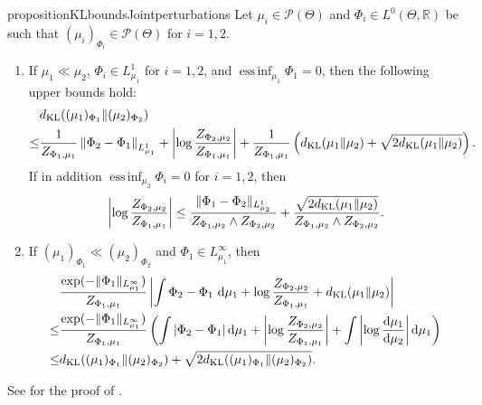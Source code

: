 \documentclass[a4paper]{scrartcl}
\theoremstyle{definition}
\numberwithin{equation}{section}
\newcommand{\R}{\mathbb{R}}
\newcommand{\rd}{\mathrm{d}}
\DeclareMathOperator*{\essinf}{ess\,inf}
\newcommand{\Abs}[1]{\left\vert#1\right\vert}
\newcommand{\norm}[1]{\Vert #1 \Vert}
\newcommand{\Norm}[1]{\left\Vert #1 \right\Vert}
\newcommand{\KL}[0]{\textup{KL}}
\begin{document}
\begin{restatable}{proposition}{KLboundsJointperturbations}
 \label{proposition_KL_bounds_misfit_and_prior_perturbations}
 Let $\mu_i\in\mathcal{P}(\Theta)$ and $\Phi_i\in L^0(\Theta,\R)$ be such that $(\mu_i)_{\Phi_i}\in\mathcal{P}(\Theta)$ for $i=1,2$.
 \begin{enumerate}
  \item \label{proposition_KL_bounds_misfit_and_prior_perturbations_upper_bounds}
  If $\mu_1\ll\mu_2$, $\Phi_i\in L^1_{\mu_1}$ for $i=1,2$, and $\essinf_{\mu_1}\Phi_1=0$, then the following upper bounds hold:
  \begin{align*}
 &d_{\KL}((\mu_1)_{\Phi_1}\Vert (\mu_2)_{\Phi_2})
\\
\leq & \frac{1}{Z_{\Phi_1,\mu_1}} \Norm{\Phi_2-\Phi_1}_{L^1_{\mu_1}} + \Abs{\log \frac{Z_{\Phi_2,\mu_2}}{Z_{\Phi_1,\mu_1}}}+\frac{1}{Z_{\Phi_1,\mu_1}} \left( d_{\KL}(\mu_1\Vert \mu_2)+\sqrt{2d_{\KL}(\mu_1\Vert \mu_2)}\right) .
\end{align*}
If in addition $\essinf_{\mu_2}\Phi_i=0$ for $i=1,2$, then
\begin{align*}
 \Abs{\log \frac{Z_{\Phi_2,\mu_2}}{Z_{\Phi_1,\mu_1}}}\leq  \frac{\norm{\Phi_1-\Phi_2}_{L^1_{\mu_2}}}{Z_{\Phi_1,\mu_2}\wedge Z_{\Phi_2,\mu_2}}+ \frac{\sqrt{2d_{\KL}(\mu_1\Vert \mu_2)}}{Z_{\Phi_1,\mu_2}\wedge Z_{\Phi_2,\mu_2}}.
\end{align*}
  \item \label{proposition_KL_bounds_misfit_and_prior_perturbations_lower_bounds}
  If $(\mu_1)_{\Phi_1}\ll (\mu_2)_{\Phi_2}$ and  $\Phi_1\in L^\infty_{\mu_1}$, then
    \begin{align*}
       &\frac{\exp(-\norm{\Phi_1}_{L^\infty_{\mu_1}})}{Z_{\Phi_1,\mu_1}} \Abs{\int  \Phi_2-\Phi_1~\rd \mu_1+\log\frac{ Z_{\Phi_2,\mu_2}}{Z_{\Phi_1,\mu_1}} +d_{\KL}(\mu_1\Vert \mu_2)} 
          \\
          \leq & \frac{\exp(-\norm{\Phi_1}_{L^\infty_{\mu_1}})}{Z_{\Phi_1,\mu_1}} \left(\int \Abs{ \Phi_2-\Phi_1}\rd \mu_1+\Abs{\log\frac{ Z_{\Phi_2,\mu_2}}{Z_{\Phi_1,\mu_1}}}+\int\Abs{\log\frac{\rd\mu_1}{\rd\mu_2}}\rd\mu_1\right)
          \\
   \leq & d_{\KL}((\mu_1)_{\Phi_1}\Vert (\mu_2)_{\Phi_2})+ \sqrt{2d_{\KL}((\mu_1)_{\Phi_1}\Vert (\mu_2)_{\Phi_2})}.
  \end{align*}
  \end{enumerate}
\end{restatable}
See  for the proof of .
\end{document}
